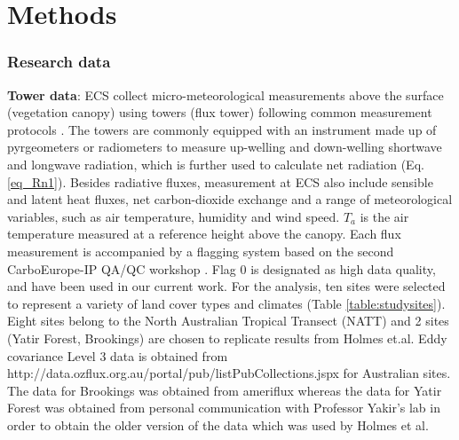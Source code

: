 \documentclass[fleqn,10pt]{wlscirep}
\begin{document}
{ 








\section{Methods}  \label{sec:Methods}
\subsubsection{Research data}
\textbf{Tower data}:
ECS collect micro-meteorological measurements above the surface (vegetation canopy) using towers (flux tower) following common measurement protocols \cite{baldocchi2001fluxnet}. The towers are commonly equipped with an instrument made up of pyrgeometers or radiometers to measure up-welling and down-welling shortwave and longwave radiation, which is further used to calculate net radiation (Eq. \ref{eq_Rn1}). Besides radiative fluxes, measurement at ECS also include sensible and latent heat fluxes, net carbon-dioxide exchange and a range of meteorological variables, such as air temperature, humidity and wind speed. $T_{a}$ is the air temperature measured at a reference height above the canopy. Each flux measurement is accompanied by a flagging system based on the second CarboEurope-IP QA/QC workshop \cite{gilberto2020fluxnet2015}. Flag 0 is designated as high data quality, and have been used in our current work. For the analysis, ten sites were selected to represent a variety of land cover types and climates (Table \ref{table:studysites}). Eight sites belong to the North Australian Tropical Transect (NATT) and 2 sites (Yatir Forest, Brookings) are chosen to replicate results from Holmes et.al\cite{holmes_land_2009-1}. Eddy covariance Level 3 data is obtained from http://data.ozflux.org.au/portal/pub/listPubCollections.jspx for Australian sites. The data for Brookings was obtained from ameriflux whereas the data for Yatir Forest was obtained from personal communication with Professor Yakir's lab in order to obtain the older version of the data which was used by Holmes et al.\cite{holmes_land_2009}%

}
\end{document}
